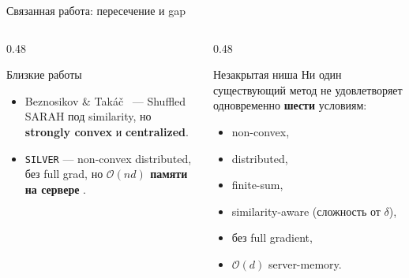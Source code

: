\documentclass[10pt,aspectratio=169,t]{beamer}
\begin{document}
\begin{frame}{Связанная работа: пересечение и gap}
\begin{columns}[T,onlytextwidth]
\begin{column}{0.48\textwidth}
\begin{block}{Близкие работы}
\begin{itemize}
  \item Beznosikov \& Tak\'a\v{c}~\cite{beznosikov2024random} — Shuffled SARAH под similarity, но \textbf{strongly convex} и \textbf{centralized}.
  \item \texttt{SILVER} \citep{oko2024silver} — non-convex distributed, без full grad, но \textbf{$\mathcal{O}(nd)$ памяти на сервере} .
  \end{itemize}
\end{block}
\end{column}

\begin{column}{0.48\textwidth}
\begin{block}{Незакрытая ниша}
Ни один существующий метод не удовлетворяет одновременно \textbf{шести} условиям:
\begin{itemize}
  \item non-convex,
  \item distributed,
  \item finite-sum,
  \item similarity-aware (сложность от $\delta$),
  \item без full gradient,
  \item $\mathcal{O}(d)$ server-memory.
\end{itemize}
\end{block}


\end{column}
\end{columns}
\end{frame}
\end{document}
